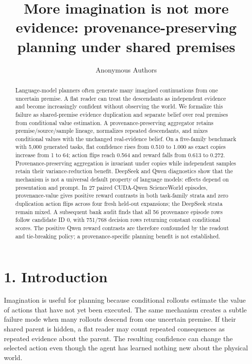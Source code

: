 \documentclass[10pt]{article}
\title{More imagination is not more evidence: provenance-preserving planning under shared premises}
\author{Anonymous Authors}
\date{}
\begin{document}
\maketitle
\begin{abstract}
Language-model planners often generate many imagined continuations from one uncertain premise. A flat reader can treat the descendants as independent evidence and become increasingly confident without observing the world. We formalize this failure as shared-premise evidence duplication and separate belief over real premises from conditional value estimation. A provenance-preserving aggregator retains premise/source/sample lineage, normalizes repeated descendants, and mixes conditional values with the unchanged real-evidence belief. On a five-family benchmark with 5,000 generated tasks, flat confidence rises from 0.510 to 1.000 as exact copies increase from 1 to 64; action flips reach 0.564 and reward falls from 0.613 to 0.272. Provenance-preserving aggregation is invariant under copies while independent samples retain their variance-reduction benefit. DeepSeek and Qwen diagnostics show that the mechanism is not a universal default property of language models: effects depend on presentation and prompt. In 27 paired CUDA-Qwen ScienceWorld episodes, provenance-value gives positive reward contrasts in both task-family strata and zero duplication action flips across four fresh held-out expansions; the DeepSeek strata remain mixed. A subsequent bank audit finds that all 56 provenance episode rows follow candidate ID 0, with 751/768 decision rows returning constant conditional scores. The positive Qwen reward contrasts are therefore confounded by the readout and tie-breaking policy; a provenance-specific planning benefit is not established.
\end{abstract}

\section{1. Introduction}

Imagination is useful for planning because conditional rollouts estimate the value of actions that have not yet been executed. The same mechanism creates a subtle failure mode when many rollouts descend from one uncertain premise. If their shared parent is hidden, a flat reader may count repeated consequences as repeated evidence about the parent. The resulting confidence can change the selected action even though the agent has learned nothing new about the physical world.
\end{document}
